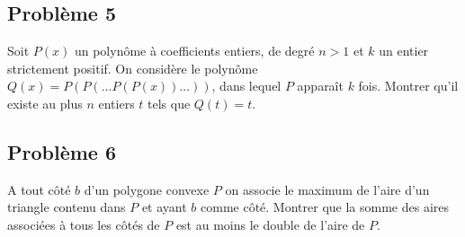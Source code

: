 \subsection*{Problème 5}
Soit $P(x)$ un polynôme à coefficients entiers, de degré $n > 1$ et $k$ un entier strictement positif. On
considère le polynôme $Q(x) = P(P(\ldots P(P(x))\ldots))$, dans lequel $P$ apparaît $k$ fois. Montrer qu'il
existe au plus $n$ entiers $t$ tels que $Q(t) = t$.

\subsection*{Problème 6}
A tout côté $b$ d'un polygone convexe $P$ on associe le maximum de l'aire d'un triangle contenu dans $P$ et
ayant $b$ comme côté. Montrer que la somme des aires associées à tous les côtés de $P$ est au moins le double
de l'aire de $P$.
